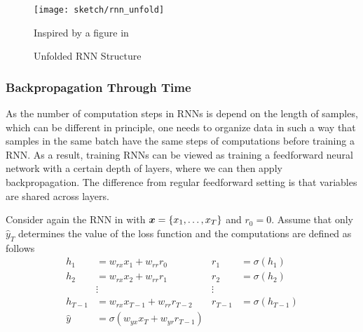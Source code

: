 \begin{figure}[!hbt]
\centering
\texttt{[image: sketch/rnn\_unfold]}
\caption{Unfolded RNN Structure}
\small{Inspired by a figure in \cite{OlahUnderstandingLSTMNetworks2015} }
\label{fig:rnn_unfold} 
\end{figure}


\subsubsection{Backpropagation Through Time}
As the number of computation steps in RNNs is depend on the length of samples, which can be different in principle, one needs to organize data in such a way that samples in the same batch have the same steps of computations before training a RNN. As a result, training RNNs can be viewed as training a feedforward neural network with a certain depth of layers, where we can then apply backpropagation. The difference from regular feedforward setting is that  variables are shared across layers.

Consider again the RNN in \addfigure{\ref{fig:rnn_unfold}} with $\boldsymbol{x} = \{x_1, \dots, x_T \}$ and $r_0 = 0$. Assume that only $\hat{y}_T$ determines the value of the loss function and the computations are defined as follows 
\begin{align}
	h_1 &= w_{rx} x_1 + w_{rr} r_0 & r_1 &= \sigma(h_1) \label{eq:naive_r} \\
	h_2 &= w_{rx} x_2 + w_{rr} r_1 &  r_2 &= \sigma(h_2) \\
	& \vdots & \vdots \\
	h_{T-1} &= w_{rx} x_{T-1} + w_{rr} r_{T-2} &  r_{T-1} &= \sigma(h_{T-1}) \\
	\hat{y} &= \sigma(w_{yx} x_T   + w_{yr} r_{T-1})
\end{align}

